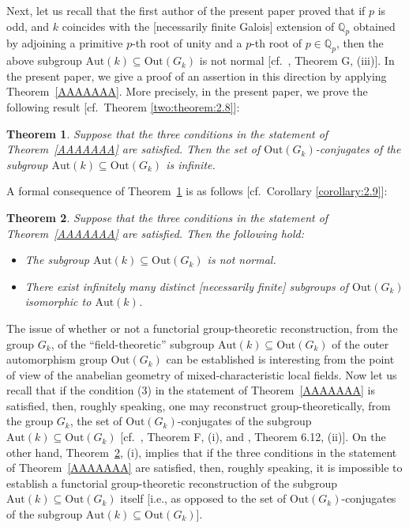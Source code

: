 \documentclass[12pt,showkeys]{amsart}
\theoremstyle{theorem}
\newtheorem{introtheorem}{Theorem}
\theoremstyle{definition}
\begin{document}
Next, let us recall that the first author of the 
present paper proved that if $p$ is odd, and $k$ 
coincides with the [necessarily finite Galois] 
extension of $\mathbb{Q}_p$ obtained by adjoining 
a primitive $p$-th root of unity and a $p$-th root 
of $p \in \mathbb{Q}_p$, then the above subgroup 
$\mathrm{Aut}(k) \subseteq \mathrm{Out}(G_k)$ is 
not normal [cf.\ \cite{Hoshi2}, Theorem G, (iii)].  
In the present paper, we give a proof of an assertion 
in this direction by applying Theorem~\ref{AAAAAAA}.  
More precisely, in the present paper, we prove the 
following result [cf.\ Theorem \ref{two:theorem:2.8}]:  


\begin{introtheorem}
\label{BBBBBBB}
Suppose that the three conditions in the statement of 
Theorem~\ref{AAAAAAA} are satisfied.  Then the set of 
$\mathrm{Out}(G_k)$-conjugates of the subgroup 
$\mathrm{Aut}(k) \subseteq \mathrm{Out}(G_k)$ is 
infinite.  
\end{introtheorem}


A formal consequence of Theorem~\ref{BBBBBBB} is as 
follows [cf.\ Corollary \ref{corollary:2.9}]:  


\begin{introtheorem}
\label{CCCCCCC}
Suppose that the three conditions in the statement of 
Theorem~\ref{AAAAAAA} are satisfied.  
Then the following hold:  
\begin{itemize}
\item[$(\mathrm{i})$]
The subgroup $\mathrm{Aut}(k) \subseteq 
\mathrm{Out}(G_k)$ is not normal.  
\item[$(\mathrm{ii})$]
There exist infinitely many distinct [necessarily 
finite] subgroups of $\mathrm{Out}(G_k)$ isomorphic 
to $\mathrm{Aut}(k)$.  
\end{itemize}
\end{introtheorem}


The issue of whether or not a functorial group-theoretic 
reconstruction, from the group $G_k$, of the 
``field-theoretic'' subgroup 
$\mathrm{Aut}(k) \subseteq \mathrm{Out}(G_k)$ 
of the outer automorphism group $\mathrm{Out}(G_k)$ 
can be established is interesting from the 
point of view of the anabelian geometry of 
mixed-characteristic local fields.  
Now let us recall that if the condition (3) in the 
statement of Theorem~\ref{AAAAAAA} 
is satisfied, then, roughly speaking, 
one may reconstruct group-theoretically, 
from the group $G_k$, the set of 
$\mathrm{Out}(G_k)$-conjugates of the 
subgroup $\mathrm{Aut}(k) \subseteq \mathrm{Out}(G_k)$ 
[cf.\ \cite{Hoshi2}, Theorem F, (i), and 
\cite{Hoshi2}, Theorem 6.12, (ii)].  
On the other hand, Theorem~\ref{CCCCCCC}, (i), 
implies that if the three conditions in the statement 
of Theorem~\ref{AAAAAAA} are satisfied, then, 
roughly speaking, it is impossible to establish 
a functorial group-theoretic reconstruction of the 
subgroup $\mathrm{Aut}(k) \subseteq \mathrm{Out}(G_k)$ 
itself [i.e., as opposed to the set of $\mathrm{Out}(G_k)$-conjugates of the subgroup 
$\mathrm{Aut}(k) \subseteq \mathrm{Out}(G_k)$].  
\end{document}
